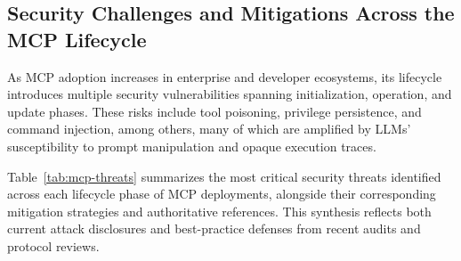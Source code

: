 \documentclass{article}
\begin{document}
\subsection{Security Challenges and Mitigations Across the MCP Lifecycle}
As MCP adoption increases in enterprise and developer ecosystems, its lifecycle introduces multiple security vulnerabilities spanning initialization, operation, and update phases. These risks include tool poisoning, privilege persistence, and command injection, among others, many of which are amplified by LLMs’ susceptibility to prompt manipulation and opaque execution traces. 

Table~\ref{tab:mcp-threats} summarizes the most critical security threats identified across each lifecycle phase of MCP deployments, alongside their corresponding mitigation strategies and authoritative references. This synthesis reflects both current attack disclosures and best-practice defenses from recent audits and protocol reviews.




\end{document}

